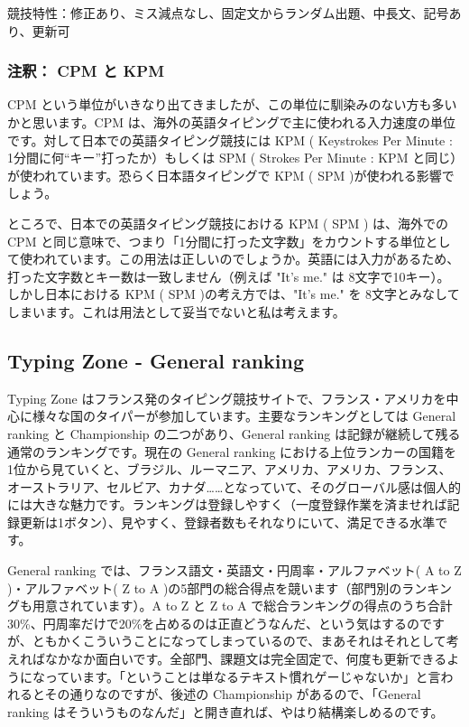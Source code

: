 競技特性：修正あり、ミス減点なし、固定文からランダム出題、中長文、記号あり、更新可

\subsubsection*{注釈： CPM と KPM}

CPM という単位がいきなり出てきましたが、この単位に馴染みのない方も多いかと思います。CPM は、海外の英語タイピングで主に使われる入力速度の単位です。対して日本での英語タイピング競技には KPM ( Keystrokes Per Minute : 1分間に何“キー”打ったか）もしくは SPM ( Strokes Per Minute : KPM と同じ）が使われています。恐らく日本語タイピングで KPM ( SPM )が使われる影響でしょう。

ところで、日本での英語タイピング競技における KPM ( SPM ) は、海外での CPM と同じ意味で、つまり「1分間に打った文字数」をカウントする単位として使われています。この用法は正しいのでしょうか。英語には入力があるため、打った文字数とキー数は一致しません（例えば "It's me." は 8文字で10キー）。しかし日本における KPM ( SPM )の考え方では、"It's me." を 8文字とみなしてしまいます。これは用法として妥当でないと私は考えます。

\subsection{Typing Zone - General ranking}

Typing Zone はフランス発のタイピング競技サイトで、フランス・アメリカを中心に様々な国のタイパーが参加しています。主要なランキングとしては General ranking と Championship の二つがあり、General ranking は記録が継続して残る通常のランキングです。現在の General ranking における上位ランカーの国籍を1位から見ていくと、ブラジル、ルーマニア、アメリカ、アメリカ、フランス、オーストラリア、セルビア、カナダ……となっていて、そのグローバル感は個人的には大きな魅力です。ランキングは登録しやすく（一度登録作業を済ませれば記録更新は1ボタン）、見やすく、登録者数もそれなりにいて、満足できる水準です。

General ranking では、フランス語文・英語文・円周率・アルファベット( A to Z )・アルファベット( Z to A )の5部門の総合得点を競います（部門別のランキングも用意されています）。A to Z と Z to A で総合ランキングの得点のうち合計30\%、円周率だけで20\%を占めるのは正直どうなんだ、という気はするのですが、ともかくこういうことになってしまっているので、まあそれはそれとして考えればなかなか面白いです。全部門、課題文は完全固定で、何度も更新できるようになっています。「ということは単なるテキスト慣れゲーじゃないか」と言われるとその通りなのですが、後述の Championship があるので、「General ranking はそういうものなんだ」と開き直れば、やはり結構楽しめるのです。

